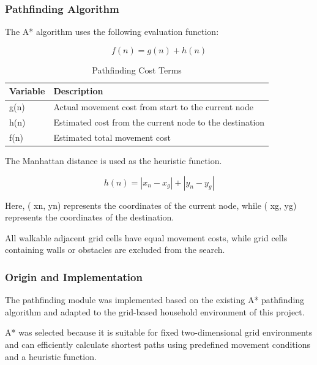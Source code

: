 \documentclass[conference]{IEEEtran}
\newlength{\tablebodywidth}
\begin{document}
\subsubsection{Pathfinding Algorithm}

The A* algorithm uses the following evaluation function:

\begin{equation}
f(n)=g(n)+h(n)
\end{equation}

\begin{table}[!t]
\caption{Pathfinding Cost Terms}
\label{tab:t22}
\centering\footnotesize
\setlength{\tabcolsep}{3pt}
\setlength{\tablebodywidth}{\dimexpr\columnwidth-12pt\relax}
\begin{tabular}{>{\raggedright\arraybackslash}p{0.220\tablebodywidth}>{\raggedright\arraybackslash}p{0.780\tablebodywidth}}
\toprule
\textbf{Variable} & \textbf{Description} \\
\midrule
g(n) & Actual movement cost from start to the current node \\
h(n) & Estimated cost from the current node to the destination \\
f(n) & Estimated total movement cost \\
\bottomrule
\end{tabular}
\end{table}

The Manhattan distance is used as the heuristic function.

\begin{equation}
h(n)=|x_n-x_g|+|y_n-y_g|
\end{equation}

Here, ( xn, yn) represents the coordinates of the current node, while ( xg, yg) represents the coordinates of the destination.

All walkable adjacent grid cells have equal movement costs, while grid cells containing walls or obstacles are excluded from the search.

\subsubsection{Origin and Implementation}

The pathfinding module was implemented based on the existing A* pathfinding algorithm and adapted to the grid-based household environment of this project.

A* was selected because it is suitable for fixed two-dimensional grid environments and can efficiently calculate shortest paths using predefined movement conditions and a heuristic function.
\end{document}
